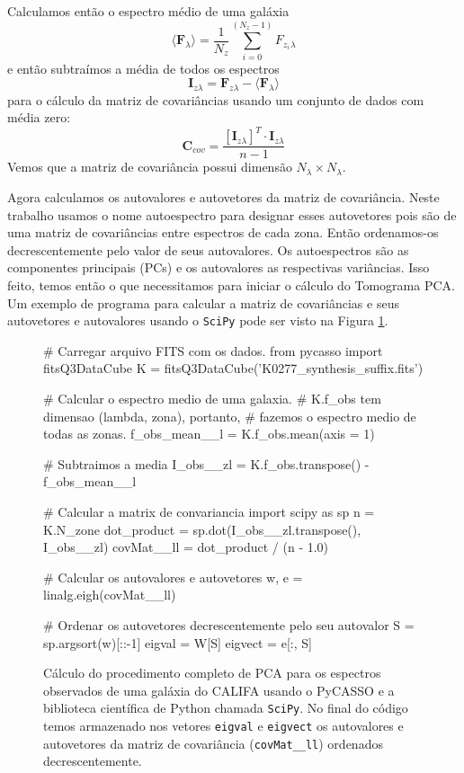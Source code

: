 Calculamos então o espectro médio de uma galáxia
\begin{equation}
\langle \textbf{F}{}_\lambda \rangle = \frac{1}{N_z} \sum_{i=0}^{(N_z - 1)} F_{z_i}{}_{\lambda}
\end{equation}
\noindent e então subtraímos a média de todos os espectros
\begin{equation}
\textbf{I}{}_{z \lambda} = \textbf{F}{}_{z \lambda} - \langle \textbf{F}{}_\lambda \rangle
\end{equation}
\noindent para o cálculo da matriz de covariâncias usando um conjunto de dados com média zero:
\begin{equation}
	\label{eq:PCA:covMatrix}
	\mathbf{C}{}_{cov} = \frac{[\mathbf{I}{}_{z \lambda}]^T \cdot \mathbf{I}{}_{z \lambda}}{n - 1}
\end{equation}
\noindent Vemos que a matriz de covariância possui dimensão $N_\lambda \times N_\lambda$.

Agora calculamos os autovalores e autovetores da matriz de covariância. Neste trabalho usamos o nome autoespectro para
designar esses autovetores pois são de uma matriz de covariâncias entre espectros de cada zona. Então ordenamos-os
decrescentemente pelo valor de seus autovalores. Os autoespectros são as componentes principais (PCs) e os autovalores
as respectivas variâncias. Isso feito, temos então o que necessitamos para iniciar o cálculo do Tomograma PCA. Um
exemplo de programa para calcular a matriz de covariâncias e seus autovetores e autovalores usando o \texttt{SciPy} pode
ser visto na Figura \ref{fig:programaCovMatrix}.

\begin{figure}
\begin{python}
# Carregar arquivo FITS com os dados.
from pycasso import fitsQ3DataCube
K = fitsQ3DataCube('K0277_synthesis_suffix.fits')

# Calcular o espectro medio de uma galaxia. 
# K.f_obs tem dimensao (lambda, zona), portanto, 
# fazemos o espectro medio de todas as zonas.
f_obs_mean__l = K.f_obs.mean(axis = 1)

# Subtraimos a media
I_obs__zl = K.f_obs.transpose() - f_obs_mean__l

# Calcular a matrix de convariancia
import scipy as sp
n = K.N_zone
dot_product = sp.dot(I_obs__zl.transpose(), I_obs__zl)
covMat__ll = dot_product / (n - 1.0)   

# Calcular os autovalores e autovetores
w, e = linalg.eigh(covMat__ll)

# Ordenar os autovetores decrescentemente pelo seu autovalor
S = sp.argsort(w)[::-1]
eigval = W[S]
eigvect = e[:, S]
 
\end{python}
	\caption[Exemplo de cálculo de PCA usando o PyCASSO e SciPy.] 
	{Cálculo do procedimento completo de PCA para os espectros observados de uma galáxia do CALIFA usando o PyCASSO e a
	biblioteca científica de Python chamada \texttt{SciPy}. No final do código temos armazenado nos vetores \texttt{eigval}
	e \texttt{eigvect} os autovalores e autovetores da matriz de covariância (\texttt{covMat\_\_ll}) ordenados
	decrescentemente.}
	\label{fig:programaCovMatrix}
\end{figure}

